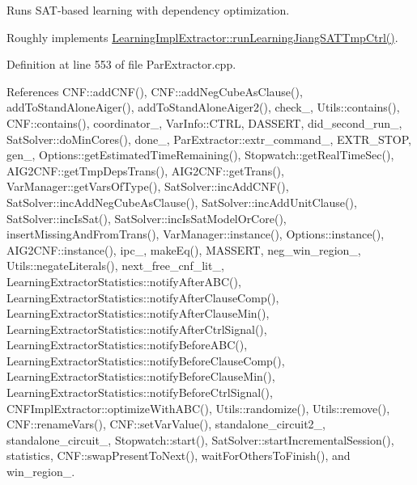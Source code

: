 Runs S\-A\-T-\/based learning with dependency optimization. 

Roughly implements \hyperlink{classLearningImplExtractor_ad41484b6bb6da18e50d31830a18e63e9}{Learning\-Impl\-Extractor\-::run\-Learning\-Jiang\-S\-A\-T\-Tmp\-Ctrl()}. 

Definition at line 553 of file Par\-Extractor.\-cpp.



References C\-N\-F\-::add\-C\-N\-F(), C\-N\-F\-::add\-Neg\-Cube\-As\-Clause(), add\-To\-Stand\-Alone\-Aiger(), add\-To\-Stand\-Alone\-Aiger2(), check\-\_\-, Utils\-::contains(), C\-N\-F\-::contains(), coordinator\-\_\-, Var\-Info\-::\-C\-T\-R\-L, D\-A\-S\-S\-E\-R\-T, did\-\_\-second\-\_\-run\-\_\-, Sat\-Solver\-::do\-Min\-Cores(), done\-\_\-, Par\-Extractor\-::extr\-\_\-command\-\_\-, E\-X\-T\-R\-\_\-\-S\-T\-O\-P, gen\-\_\-, Options\-::get\-Estimated\-Time\-Remaining(), Stopwatch\-::get\-Real\-Time\-Sec(), A\-I\-G2\-C\-N\-F\-::get\-Tmp\-Deps\-Trans(), A\-I\-G2\-C\-N\-F\-::get\-Trans(), Var\-Manager\-::get\-Vars\-Of\-Type(), Sat\-Solver\-::inc\-Add\-C\-N\-F(), Sat\-Solver\-::inc\-Add\-Neg\-Cube\-As\-Clause(), Sat\-Solver\-::inc\-Add\-Unit\-Clause(), Sat\-Solver\-::inc\-Is\-Sat(), Sat\-Solver\-::inc\-Is\-Sat\-Model\-Or\-Core(), insert\-Missing\-And\-From\-Trans(), Var\-Manager\-::instance(), Options\-::instance(), A\-I\-G2\-C\-N\-F\-::instance(), ipc\-\_\-, make\-Eq(), M\-A\-S\-S\-E\-R\-T, neg\-\_\-win\-\_\-region\-\_\-, Utils\-::negate\-Literals(), next\-\_\-free\-\_\-cnf\-\_\-lit\-\_\-, Learning\-Extractor\-Statistics\-::notify\-After\-A\-B\-C(), Learning\-Extractor\-Statistics\-::notify\-After\-Clause\-Comp(), Learning\-Extractor\-Statistics\-::notify\-After\-Clause\-Min(), Learning\-Extractor\-Statistics\-::notify\-After\-Ctrl\-Signal(), Learning\-Extractor\-Statistics\-::notify\-Before\-A\-B\-C(), Learning\-Extractor\-Statistics\-::notify\-Before\-Clause\-Comp(), Learning\-Extractor\-Statistics\-::notify\-Before\-Clause\-Min(), Learning\-Extractor\-Statistics\-::notify\-Before\-Ctrl\-Signal(), C\-N\-F\-Impl\-Extractor\-::optimize\-With\-A\-B\-C(), Utils\-::randomize(), Utils\-::remove(), C\-N\-F\-::rename\-Vars(), C\-N\-F\-::set\-Var\-Value(), standalone\-\_\-circuit2\-\_\-, standalone\-\_\-circuit\-\_\-, Stopwatch\-::start(), Sat\-Solver\-::start\-Incremental\-Session(), statistics, C\-N\-F\-::swap\-Present\-To\-Next(), wait\-For\-Others\-To\-Finish(), and win\-\_\-region\-\_\-.

